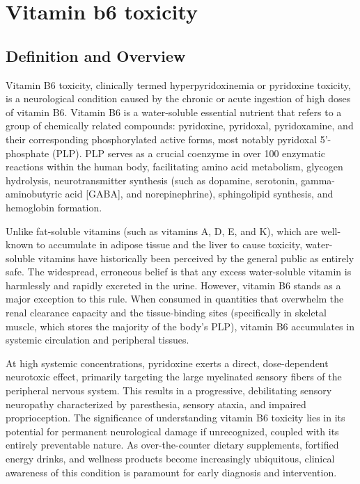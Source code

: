 \chapter{Vitamin b6 toxicity}

\section*{Definition and Overview}
Vitamin B6 toxicity, clinically termed hyperpyridoxinemia or pyridoxine toxicity, is a neurological condition caused by the chronic or acute ingestion of high doses of vitamin B6. Vitamin B6 is a water-soluble essential nutrient that refers to a group of chemically related compounds: pyridoxine, pyridoxal, pyridoxamine, and their corresponding phosphorylated active forms, most notably pyridoxal 5'-phosphate (PLP). PLP serves as a crucial coenzyme in over 100 enzymatic reactions within the human body, facilitating amino acid metabolism, glycogen hydrolysis, neurotransmitter synthesis (such as dopamine, serotonin, gamma-aminobutyric acid [GABA], and norepinephrine), sphingolipid synthesis, and hemoglobin formation.

Unlike fat-soluble vitamins (such as vitamins A, D, E, and K), which are well-known to accumulate in adipose tissue and the liver to cause toxicity, water-soluble vitamins have historically been perceived by the general public as entirely safe. The widespread, erroneous belief is that any excess water-soluble vitamin is harmlessly and rapidly excreted in the urine. However, vitamin B6 stands as a major exception to this rule. When consumed in quantities that overwhelm the renal clearance capacity and the tissue-binding sites (specifically in skeletal muscle, which stores the majority of the body's PLP), vitamin B6 accumulates in systemic circulation and peripheral tissues.

At high systemic concentrations, pyridoxine exerts a direct, dose-dependent neurotoxic effect, primarily targeting the large myelinated sensory fibers of the peripheral nervous system. This results in a progressive, debilitating sensory neuropathy characterized by paresthesia, sensory ataxia, and impaired proprioception. The significance of understanding vitamin B6 toxicity lies in its potential for permanent neurological damage if unrecognized, coupled with its entirely preventable nature. As over-the-counter dietary supplements, fortified energy drinks, and wellness products become increasingly ubiquitous, clinical awareness of this condition is paramount for early diagnosis and intervention.

